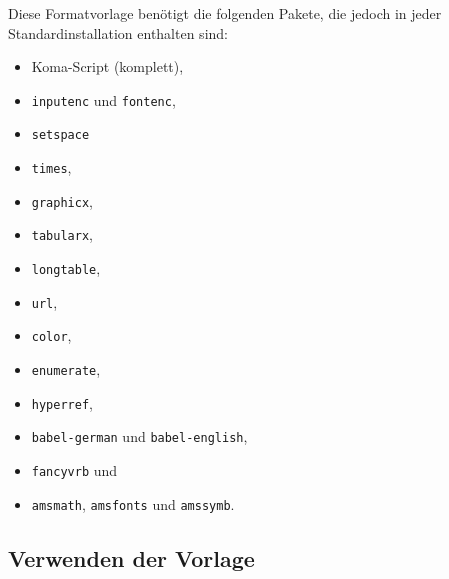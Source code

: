 \documentclass[plainarticle,zihtitle,german,final,hyperref,utf8]{zihpub}
\begin{document}
Diese Formatvorlage benötigt die folgenden Pakete, die jedoch in jeder Standardinstallation enthalten sind:
\begin{itemize}
	\item  Koma-Script (komplett),
	\item \texttt{inputenc} und \texttt{fontenc},
	\item \texttt{setspace}
	\item \texttt{times},
	\item \texttt{graphicx},
	\item \texttt{tabularx},
	\item \texttt{longtable},
	\item \texttt{url},
	\item \texttt{color},
	\item \texttt{enumerate},
	\item \texttt{hyperref},
    \item \texttt{babel-german} und \texttt{babel-english},
	\item \texttt{fancyvrb} und
	\item \texttt{amsmath}, \texttt{amsfonts} und \texttt{amssymb}.
\end{itemize}

\subsection{Verwenden der Vorlage}
\end{document}
